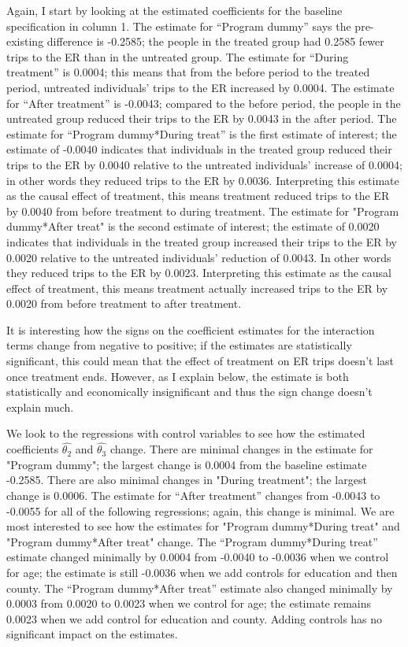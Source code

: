 \documentclass[a4paper]{article}
\begin{document}
Again, I start by looking at the estimated coefficients for the baseline specification in column 1. The estimate for “Program dummy” says the pre-existing difference is -0.2585; the people in the treated group had 0.2585 fewer trips to the ER than in the untreated group. The estimate for “During treatment” is 0.0004; this means that from the before period to the treated period, untreated individuals’ trips to the ER increased by 0.0004. The estimate for “After treatment” is -0.0043; compared to the before period, the people in the untreated group reduced their trips to the ER by 0.0043 in the after period. The estimate for “Program dummy*During treat” is the first estimate of interest; the estimate of -0.0040 indicates that individuals in the treated group reduced their trips to the ER by 0.0040 relative to the untreated individuals’ increase of 0.0004; in other words they reduced trips to the ER by 0.0036. Interpreting this estimate as the causal effect of treatment, this means treatment reduced trips to the ER by 0.0040 from before treatment to during treatment. The estimate for "Program dummy*After treat" is the second estimate of interest; the estimate of 0.0020 indicates that individuals in the treated group increased their trips to the ER by 0.0020 relative to the untreated individuals’ reduction of 0.0043. In other words they reduced trips to the ER by 0.0023. Interpreting this estimate as the causal effect of treatment, this means treatment actually increased trips to the ER by 0.0020 from before treatment to after treatment. 

It is interesting how the signs on the coefficient estimates for the interaction terms change from negative to positive; if the estimates are statistically significant, this could mean that the effect of treatment on ER trips doesn’t last once treatment ends. However, as I explain below, the estimate is both statistically and economically insignificant and thus the sign change doesn’t explain much.

We look to the regressions with control variables to see how the estimated coefficients $\hat{\theta_{2}}$ and $\hat{\theta_{3}}$ change. There are minimal changes in the estimate for "Program dummy"; the largest change is 0.0004 from the baseline estimate -0.2585. There are also minimal changes in "During treatment"; the largest change is 0.0006. The estimate for “After treatment” changes from -0.0043 to -0.0055 for all of the following regressions; again, this change is minimal. We are most interested to see how the estimates for "Program dummy*During treat" and "Program dummy*After treat" change. The “Program dummy*During treat” estimate changed minimally by 0.0004 from -0.0040 to -0.0036 when we control for age; the estimate is still -0.0036 when we add controls for education and then county. The “Program dummy*After treat” estimate also changed minimally by 0.0003 from 0.0020 to 0.0023 when we control for age; the estimate remains 0.0023 when we add control for education and county. Adding controls has no significant impact on the estimates.
\end{document}
